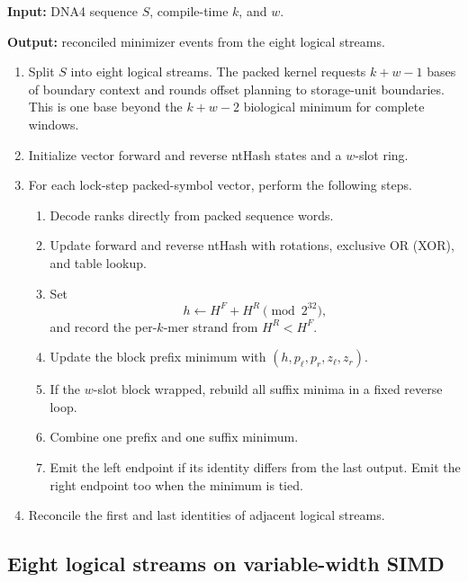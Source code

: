 \begin{algorithm}[H]
\caption{BioSeqDB PNT1 data-independent ntHash minimizers}
\label{alg:paper-nthash}
\small
\textbf{Input:} DNA4 sequence \(S\), compile-time \(k\), and \(w\).

\textbf{Output:} reconciled minimizer events from the eight logical streams.

\begin{enumerate}
  \item Split \(S\) into eight logical streams. The packed kernel requests
    \(k+w-1\) bases of boundary context and rounds offset planning to
    storage-unit boundaries. This is one base beyond the \(k+w-2\)
    biological minimum for complete windows.
  \item Initialize vector forward and reverse ntHash states and a
    \(w\)-slot ring.
  \item For each lock-step packed-symbol vector, perform the following steps.
    \begin{enumerate}
      \item Decode ranks directly from packed sequence words.
      \item Update forward and reverse ntHash with rotations, exclusive OR
        (XOR), and table lookup.
      \item Set
        \[
          h\gets H^F+H^R\pmod{2^{32}},
        \]
        and record the per-\(k\)-mer strand from \(H^R<H^F\).
      \item Update the block prefix minimum with
        \((h,p_\ell,p_r,z_\ell,z_r)\).
      \item If the \(w\)-slot block wrapped, rebuild all suffix minima in a
        fixed reverse loop.
      \item Combine one prefix and one suffix minimum.
      \item Emit the left endpoint if its identity differs from the last
        output. Emit the right endpoint too when the minimum is tied.
    \end{enumerate}
  \item Reconcile the first and last identities of adjacent logical streams.
\end{enumerate}
\end{algorithm}

\subsection{Eight logical streams on variable-width SIMD}

